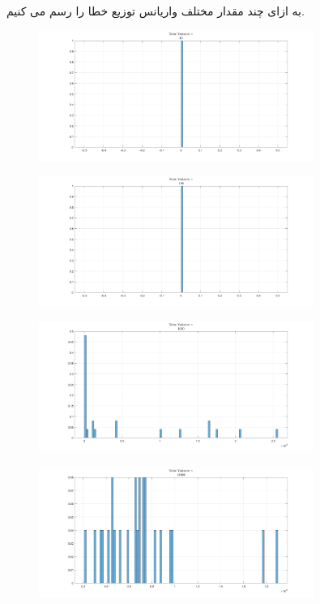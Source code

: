 \documentclass[a4paper]{article}
\begin{document}
	\subsection{}
	به ازای چند مقدار مختلف واریانس توزیع خطا را رسم می کنیم.
		\begin{figure}[H]
		\includegraphics[width=0.8\textwidth]{comsys_fig52.png}\\ 
		\centering
	\end{figure}
		\begin{figure}[H]
		\includegraphics[width=0.8\textwidth]{comsys_fig53.png}\\ 
		\centering
	\end{figure}
		\begin{figure}[H]
		\includegraphics[width=0.8\textwidth]{comsys_fig54.png}\\ 
		\centering
	\end{figure}
		\begin{figure}[H]
		\includegraphics[width=0.8\textwidth]{comsys_fig55.png}\\ 
		\centering
	\end{figure}
\end{document}
